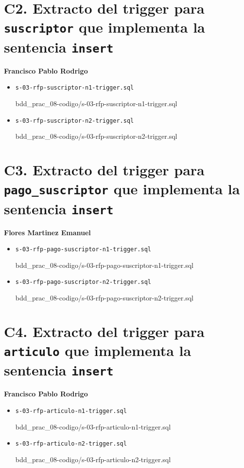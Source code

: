 \documentclass{article}
\newcommand{\codedir}{bdd_prac_08-codigo}
\begin{document}
\section*{C2. Extracto del trigger para \texttt{suscriptor} que implementa la 
sentencia \texttt{insert}}
\textbf{Francisco Pablo Rodrigo}
\begin{itemize}
  \item \texttt{s-03-rfp-suscriptor-n1-trigger.sql}
  
  {\codedir/s-03-rfp-suscriptor-n1-trigger.sql}

  \item \texttt{s-03-rfp-suscriptor-n2-trigger.sql}
  
  {\codedir/s-03-rfp-suscriptor-n2-trigger.sql}
\end{itemize}

\section*{C3. Extracto del trigger para \texttt{pago\_suscriptor} que 
implementa la sentencia \texttt{insert}}

\textbf{Flores Martinez Emanuel}
\begin{itemize}
  \item \texttt{s-03-rfp-pago-suscriptor-n1-trigger.sql}
  
  {\codedir/s-03-rfp-pago-suscriptor-n1-trigger.sql}

  \item \texttt{s-03-rfp-pago-suscriptor-n2-trigger.sql}
  
  {\codedir/s-03-rfp-pago-suscriptor-n2-trigger.sql}
\end{itemize}

\section*{C4. Extracto del trigger para \texttt{articulo} que 
implementa la sentencia \texttt{insert}}

\textbf{Francisco Pablo Rodrigo}
\begin{itemize}
  \item \texttt{s-03-rfp-articulo-n1-trigger.sql}
  
  {\codedir/s-03-rfp-articulo-n1-trigger.sql}

  \item \texttt{s-03-rfp-articulo-n2-trigger.sql}
  
  {\codedir/s-03-rfp-articulo-n2-trigger.sql}
\end{itemize}
\end{document}
